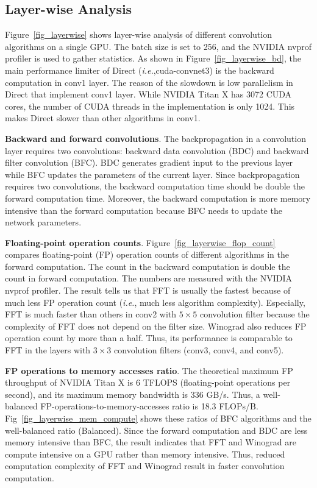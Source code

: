 \subsection{Layer-wise Analysis}

Figure~\ref{fig_layerwise} shows layer-wise analysis of different convolution algorithms on a single GPU. The batch size is set to 256, and the NVIDIA nvprof profiler is used to gather statistics. As shown in Figure~\ref{fig_layerwise_bd}, the main performance limiter of \textsf{Direct} (\textit{i.e.},cuda-convnet3) is the backward computation in \textsf{conv1} layer. The reason of the slowdown is low parallelism in \textsf{Direct} that implement \textsf{conv1} layer. While NVIDIA Titan X has 3072 CUDA cores, the number of CUDA threads in the implementation is only 1024. This makes \textsf{Direct} slower than other algorithms in \textsf{conv1}. 

{\bf Backward and forward convolutions}. The backpropagation in a convolution layer requires two convolutions: backward data convolution (\textsf{BDC}) and backward filter convolution (\textsf{BFC}). \textsf{BDC} generates gradient input to the previous layer while \textsf{BFC} updates the parameters of the current layer. Since backpropagation requires two convolutions, the backward computation time should be double the forward computation time. Moreover, the backward computation is more memory intensive than the forward computation because \textsf{BFC} needs to update the network parameters.

{\bf Floating-point operation counts}. Figure~\ref{fig_layerwise_flop_count} compares floating-point (FP) operation counts of different algorithms in the forward computation. The count in the backward computation is double the count in forward computation.  The numbers are measured with the NVIDIA nvprof profiler. The result tells us that \textsf{FFT} is usually the fastest because of much less FP operation count (\textit{i.e.}, much less algorithm complexity). Especially, \textsf{FFT} is much faster than others in \textsf{conv2} with $5 \times 5$ convolution filter because the complexity of \textsf{FFT} does not depend on the filter size. \textsf{Winograd} also reduces FP operation count by more than a half. Thus, its performance is comparable to \textsf{FFT} in the layers with $3 \times 3$ convolution filters (\textsf{conv3}, \textsf{conv4}, and \textsf{conv5}).

{\bf FP operations to memory accesses ratio}. The theoretical maximum FP throughput of NVIDIA Titan X is 6 TFLOPS (floating-point operations per second), and its maximum memory bandwidth is 336 GB/s. Thus, a well-balanced FP-operations-to-memory-accesses ratio is 18.3 FLOPs/B. Fig~\ref{fig_layerwise_mem_compute} shows these ratios of \textsf{BFC} algorithms and the well-balanced ratio (\textsf{Balanced}). Since the forward computation and \textsf{BDC} are less memory intensive than \textsf{BFC}, the result indicates that \textsf{FFT} and \textsf{Winograd} are compute intensive on a GPU rather than memory intensive. Thus, reduced computation complexity of \textsf{FFT} and \textsf{Winograd} result in faster convolution computation.

